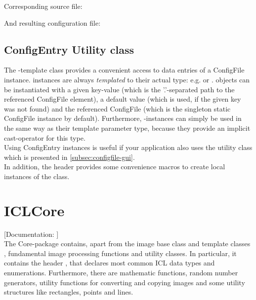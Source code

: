 
Corresponding source file:


And resulting configuration file:


\subsection{ConfigEntry Utility class}
The -template class  provides a convenient access to data entries of a ConfigFile instance.  instances are always \emph{templated} to their actual type: e.g.  or .  objects can be instantiated with a given key-value (which is the '.'-separated path to the referenced ConfigFile element), a default value (which is used, if the given key was not found) and the referenced ConfigFile (which is the singleton static ConfigFile instance by default). Furthermore, -instances can simply be used in the same way as their template parameter type, because they provide an implicit cast-operator for this type.\\
Using ConfigEntry instances is useful if your application also uses the  utility class  which is presented in \ref{subsec:configfile-gui}.\\
In addition, the header  provides some convenience macros to create local instances of the  class.

\section{ICLCore}

[Documentation: ]\\
The Core-package contains, apart from the image base class  and template classes , fundamental image processing functions and utility classes. In particular, it contains the header , that declares most common ICL data types and enumerations. Furthermore, there are mathematic functions, random number generators, utility functions for converting and copying images and some utility structures like rectangles, points and lines.

